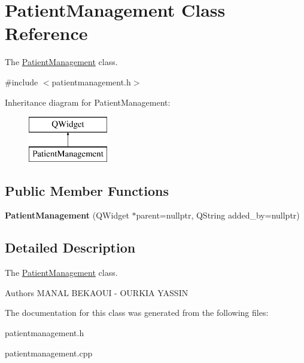 \hypertarget{class_patient_management}{}\section{Patient\+Management Class Reference}
\label{class_patient_management}


The \mbox{\hyperlink{class_patient_management}{Patient\+Management}} class.  




{\ttfamily \#include $<$patientmanagement.\+h$>$}

Inheritance diagram for Patient\+Management\+:\begin{figure}[H]
\begin{center}
\leavevmode
\includegraphics[height=2.000000cm]{class_patient_management}
\end{center}
\end{figure}
\subsection*{Public Member Functions}
\begin{DoxyCompactItemize}
\item 
\mbox{\label{class_patient_management_a33cab438cb0409f198366a56f68c8181}} 
{\bfseries Patient\+Management} (Q\+Widget $\ast$parent=nullptr, Q\+String added\+\_\+by=nullptr)
\end{DoxyCompactItemize}


\subsection{Detailed Description}
The \mbox{\hyperlink{class_patient_management}{Patient\+Management}} class. 

\begin{DoxyAuthor}{Authors}
M\+A\+N\+AL B\+E\+K\+A\+O\+UI -\/ O\+U\+R\+K\+IA Y\+A\+S\+S\+IN 
\end{DoxyAuthor}


The documentation for this class was generated from the following files\+:\begin{DoxyCompactItemize}
\item 
patientmanagement.\+h\item 
patientmanagement.\+cpp\end{DoxyCompactItemize}
